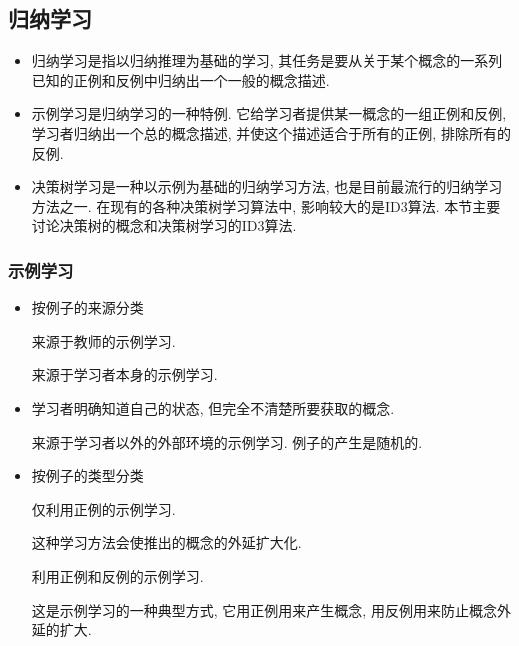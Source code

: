 \subsection{归纳学习}
\begin{itemize}
    \item 归纳学习是指以归纳推理为基础的学习, 其任务是要从关于某个概念的一系列已知的正例和反例中归纳出一个一般的概念描述.
    \item 示例学习是归纳学习的一种特例. 它给学习者提供某一概念的一组正例和反例, 学习者归纳出一个总的概念描述, 并使这个描述适合于所有的正例, 排除所有的反例.
    \item 决策树学习是一种以示例为基础的归纳学习方法, 也是目前最流行的归纳学习方法之一. 
    在现有的各种决策树学习算法中, 影响较大的是ID3算法. 本节主要讨论决策树的概念和决策树学习的ID3算法.
\end{itemize}
\subsubsection{示例学习}
\begin{itemize}
\item 按例子的来源分类

  \qquad  {} 来源于教师的示例学习.

  \qquad  {} 来源于学习者本身的示例学习.
\item 学习者明确知道自己的状态, 但完全不清楚所要获取的概念.

    \qquad  {} 来源于学习者以外的外部环境的示例学习. 例子的产生是随机的.
\item 按例子的类型分类

    \qquad  {} 仅利用正例的示例学习.

    \qquad  \qquad 这种学习方法会使推出的概念的外延扩大化.

    \qquad  {} 利用正例和反例的示例学习.

    \qquad  这是示例学习的一种典型方式, 它用正例用来产生概念, 用反例用来防止概念外延的扩大.
\end{itemize}
